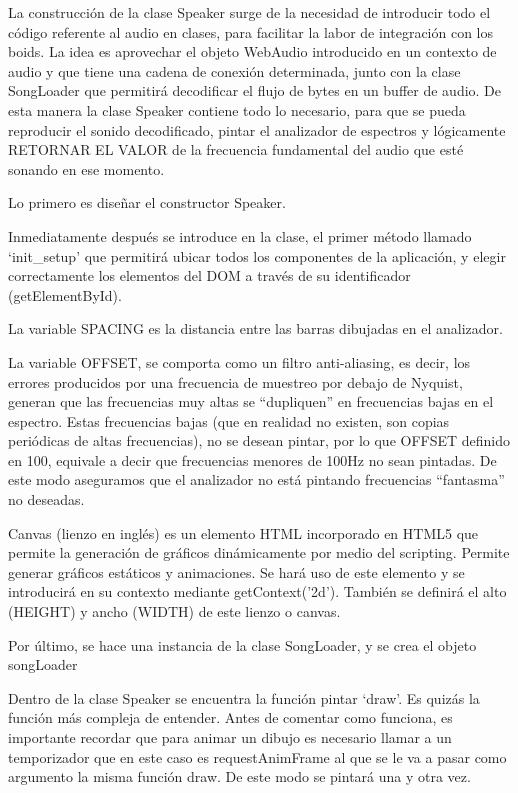La construcción de la clase Speaker surge de la necesidad de introducir todo el código referente al audio en clases, para facilitar la labor de integración con los boids.  La idea es aprovechar el objeto WebAudio introducido en un contexto de audio y que tiene una cadena de conexión determinada, junto con la clase SongLoader que permitirá decodificar el flujo de bytes en un buffer de audio. De esta manera la clase Speaker contiene todo lo necesario, para que se pueda reproducir el sonido decodificado, pintar el analizador de espectros y lógicamente RETORNAR EL VALOR de la frecuencia fundamental del audio que esté sonando en ese momento.

Lo primero es diseñar el constructor Speaker.

Inmediatamente después se introduce en la clase, el primer método llamado ‘init\_setup’ que permitirá ubicar todos los componentes de la aplicación, y elegir correctamente los elementos del  DOM a través de su identificador (getElementById). 

La  variable  SPACING es la distancia entre las barras dibujadas en el analizador. 

La variable OFFSET,  se comporta como un filtro anti-aliasing, es decir, los errores producidos por una frecuencia de muestreo por debajo de Nyquist,  generan que las frecuencias muy altas se “dupliquen” en frecuencias bajas en el espectro. Estas frecuencias bajas (que en realidad no existen, son copias periódicas de altas frecuencias), no se desean pintar, por lo que OFFSET definido en 100, equivale a decir que frecuencias menores de 100Hz no sean pintadas. De este modo aseguramos que el analizador no está pintando frecuencias “fantasma” no deseadas.  

Canvas (lienzo en inglés) es un elemento HTML incorporado en HTML5 que permite la generación de gráficos dinámicamente por medio del scripting. Permite generar gráficos estáticos y animaciones. Se hará uso de este elemento y se introducirá en su contexto mediante getContext('2d'). También se definirá el alto (HEIGHT)  y ancho (WIDTH) de este lienzo o canvas.

Por último, se hace una instancia de la clase SongLoader, y se crea el objeto songLoader

Dentro de la clase Speaker se encuentra la función pintar ‘draw’. Es quizás la función más compleja de entender.  Antes de comentar  como funciona, es importante recordar que para animar un dibujo es necesario llamar a un temporizador que en este caso es requestAnimFrame al que se le va a pasar como argumento la misma función draw. De este modo se pintará una y otra vez.

